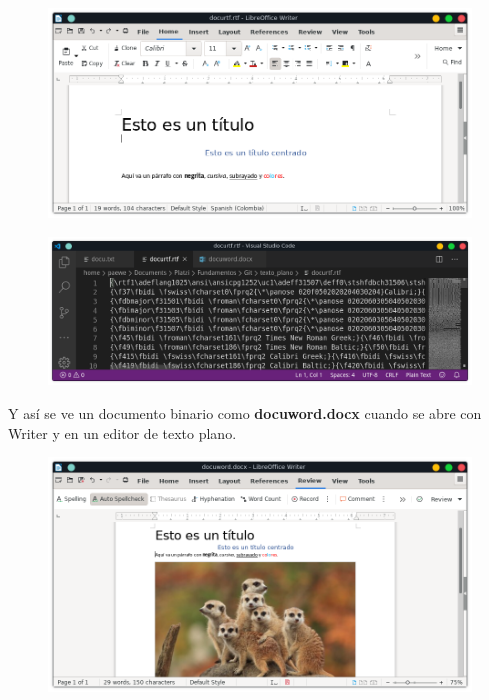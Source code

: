 \documentclass{article}
\begin{document}
\begin{figure}[h!]
  \centering
  \includegraphics[scale=0.5]{./Pictures/057_rtf.png}
\end{figure}

\begin{figure}[h!]
  \centering
  \includegraphics[scale=0.5]{./Pictures/051_texto_rtf.png}
\end{figure}

\newpage

Y así se ve un documento binario como \textbf{docuword.docx} cuando se abre con
Writer y en un editor de texto plano.

\begin{figure}[h!]
  \centering
  \includegraphics[scale=0.5]{./Pictures/056_docx.png}
\end{figure}
\end{document}
